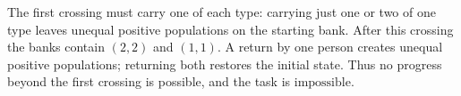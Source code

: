 The first crossing must carry one of each type: carrying just one or two of one type leaves unequal positive populations on the starting bank. After this crossing the banks contain $(2,2)$ and $(1,1)$. A return by one person creates unequal positive populations; returning both restores the initial state. Thus no progress beyond the first crossing is possible, and the task is $\boxed{\text{impossible}}$.
